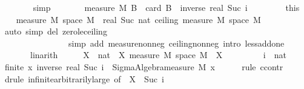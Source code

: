 \documentclass[leqno]{article}
\theoremstyle{definition}
\begin{document}
\begin{isabellebody}
\ \ \ \ \ \ \isamarkupfalse%
\ simp\isanewline
\ \ \ \ \isamarkupfalse%
\ \isamarkupfalse%
\ {\isachardoublequoteopen}measure\ M\ B\ {\isasymge}\ card\ B\ {\isacharasterisk}\ inverse\ {\isacharparenleft}real\ {\isacharparenleft}Suc\ i{\isacharparenright}{\isacharparenright}{\isachardoublequoteclose}\ \isacommand{{\isachardot}}\isamarkupfalse%
\isanewline
\ \ \isacommand{{\isacharbraceright}}\isamarkupfalse%
\ \isamarkupfalse%
\ {\isacharasterisk}\ {\isacharequal}\ this\isanewline
\ \ \isamarkupfalse%
\ {\isachardoublequoteopen}measure\ M\ {\isacharparenleft}space\ M{\isacharparenright}\ {\isacharless}\ real\ {\isacharparenleft}Suc\ {\isacharparenleft}nat\ {\isacharparenleft}ceiling\ {\isacharparenleft}measure\ M\ {\isacharparenleft}space\ M{\isacharparenright}{\isacharparenright}{\isacharparenright}{\isacharparenright}{\isacharparenright}{\isachardoublequoteclose}\isanewline
\ \ \ \ \isamarkupfalse%
\ {\isacharparenleft}auto\ simp\ del{\isacharcolon}\ zero{\isacharunderscore}le{\isacharunderscore}ceiling\isanewline
\ \ \ \ \ \ \ \ \ \ \ \ \ \ \ \ simp\ add{\isacharcolon}\ measure{\isacharunderscore}nonneg\ ceiling{\isacharunderscore}nonneg\ intro{\isacharbang}{\isacharcolon}\ less{\isacharunderscore}add{\isacharunderscore}one{\isacharparenright}\isanewline
\ \ \ \ \ \ \ linarith\isanewline
\ \ \isamarkupfalse%
\ \isamarkupfalse%
\ X\ {\isacharcolon}{\isacharcolon}\ nat\ \ X{\isacharcolon}\ {\isachardoublequoteopen}measure\ M\ {\isacharparenleft}space\ M{\isacharparenright}\ {\isacharless}\ X{\isachardoublequoteclose}\ \isacommand{{\isachardot}{\isachardot}}\isamarkupfalse%
\isanewline
\ \ \isanewline
\ \ \isacommand{{\isacharbraceleft}}\isamarkupfalse%
\ \isamarkupfalse%
\ i\ {\isacharcolon}{\isacharcolon}\ nat\isanewline
\ \ \isamarkupfalse%
\ {\isachardoublequoteopen}finite\ {\isacharbraceleft}x{\isachardot}\ inverse\ {\isacharparenleft}real\ {\isacharparenleft}Suc\ i{\isacharparenright}{\isacharparenright}\ {\isacharless}\ Sigma{\isacharunderscore}Algebra{\isachardot}measure\ M\ {\isacharbraceleft}x{\isacharbraceright}{\isacharbraceright}{\isachardoublequoteclose}\isanewline
\ \ \ \ \isamarkupfalse%
\ {\isacharparenleft}rule\ ccontr{\isacharparenright}\isanewline
\ \ \ \ \isamarkupfalse%
\ {\isacharparenleft}drule\ infinite{\isacharunderscore}arbitrarily{\isacharunderscore}large\ {\isacharbrackleft}of\ {\isacharunderscore}\ {\isachardoublequoteopen}X\ {\isacharasterisk}\ Suc\ i{\isachardoublequoteclose}{\isacharbrackright}{\isacharparenright}\isanewline

\end{isabellebody}
\end{document}
